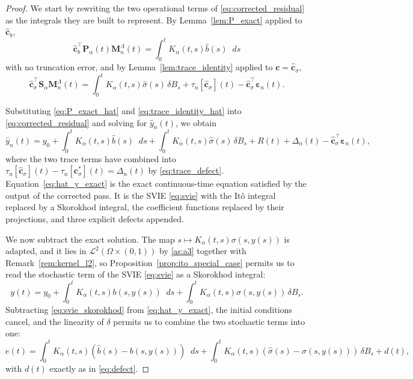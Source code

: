 \documentclass[11pt, a4paper]{article}
\theoremstyle{theoremstyle}
\theoremstyle{definitionstyle}
\newcommand{\dd}{\mathop{}\!d}
\begin{document}
\begin{proof}
    We start by rewriting the two operational terms of \eqref{eq:corrected_residual} as the integrals they are built to represent. By Lemma~\ref{lem:P_exact} applied to $\hat{\mathbf c}_b$,
    \begin{equation}\label{eq:P_exact_hat}
        \hat{\mathbf c}_b^\top \mathbf P_\alpha(t)\mathbf M_n^\Lambda(t) = \int_0^t K_\alpha(t, s)\hat b(s)\dd{s}
    \end{equation}
    with no truncation error, and by Lemma~\ref{lem:trace_identity} applied to $\mathbf c = \hat{\mathbf c}_\sigma$,
    \begin{equation}\label{eq:trace_identity_hat}
        \hat{\mathbf c}_\sigma^\top \mathbf S_\alpha \mathbf M_n^\Lambda(t) = \int_0^t K_\alpha(t, s)\hat \sigma(s)\, \delta B_s + \tau_n[\hat{\mathbf c}_\sigma](t) - \hat{\mathbf c}_\sigma^\top \boldsymbol \varepsilon_n(t).
    \end{equation}

    Substituting \eqref{eq:P_exact_hat} and \eqref{eq:trace_identity_hat} into \eqref{eq:corrected_residual} and solving for $\hat y_n(t)$, we obtain
    \begin{equation}\label{eq:hat_y_exact}
        \hat y_n(t) = y_0 + \int_0^t K_\alpha(t, s)\hat b(s)\dd{s} + \int_0^t K_\alpha(t, s)\hat \sigma(s)\, \delta B_s + R(t) + \Delta_n(t) - \hat{\mathbf c}_\sigma^\top \boldsymbol \varepsilon_n(t),
    \end{equation}
    where the two trace terms have combined into $\tau_n[\hat{\mathbf c}_\sigma](t) - \tau_n[\mathbf c^*_\sigma](t) = \Delta_n(t)$ by \eqref{eq:trace_defect}. Equation~\eqref{eq:hat_y_exact} is the exact continuous-time equation satisfied by the output of the corrected pass. It is the SVIE \eqref{eq:svie} with the It\^o integral replaced by a Skorokhod integral, the coefficient functions replaced by their projections, and three explicit defects appended.

    We now subtract the exact solution. The map $s \mapsto K_\alpha(t, s)\sigma(s, y(s))$ is adapted, and it lies in $\mathcal L^2(\Omega \times (0, 1))$ by \ref{as:a3} together with Remark~\ref{rem:kernel_l2}, so Proposition~\ref{prop:ito_special_case} permits us to read the stochastic term of the SVIE \eqref{eq:svie} as a Skorokhod integral:
    \begin{equation}\label{eq:svie_skorokhod}
        y(t) = y_0 + \int_0^t K_\alpha(t, s)b(s, y(s))\dd{s} + \int_0^t K_\alpha(t, s)\sigma(s, y(s))\, \delta B_s.
    \end{equation}
    Subtracting \eqref{eq:svie_skorokhod} from \eqref{eq:hat_y_exact}, the initial conditions cancel, and the linearity of $\delta$ permits us to combine the two stochastic terms into one:
    \begin{equation}\label{eq:error_prelim}
        e(t) = \int_0^t K_\alpha(t, s) \left ( \hat b(s) - b(s, y(s)) \right )\dd{s} + \int_0^t K_\alpha(t, s) \left ( \hat \sigma(s) - \sigma(s, y(s)) \right )\, \delta B_s + d(t),
    \end{equation}
    with $d(t)$ exactly as in \eqref{eq:defect}.


\end{proof}
\end{document}
